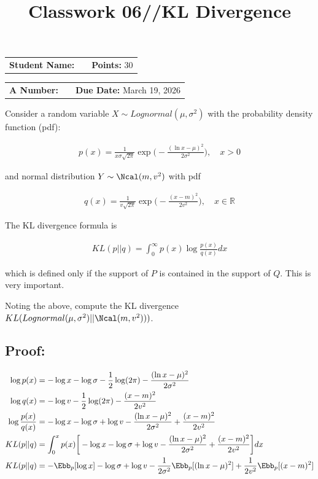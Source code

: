 \documentclass[12pt, xcolor=dvipsnames,svgnames,x11names]{article}
\makeatletter
\newcommand{\hw}{Classwork 06//KL Divergence}
\newcommand{\duedate}{March 19, 2026}
\renewcommand{\maketitle}{%
    \vspace*{0.2cm}
    \begin{center}
        \begin{tcolorbox}[
            enhanced,
            colback=white,
            colframe=headerRed,
            arc=0mm,
            title={\textcolor{white}{\bfseries \@title}},
            coltitle=white,
            fonttitle=\bfseries\large,
            attach boxed title to top left={xshift=10pt, yshift=-\tcboxedtitleheight/2},
            boxed title style={sharp corners, colback=headerRed, frame hidden}
        ]
        \large
        \vspace{10pt}
\noindent
\begin{tabular}{@{}p{3.5cm}p{6cm}r@{}}
\textbf{Student Name:} & \underline{\hspace{6cm}} & \textbf{Points:} 30 \\
\end{tabular}

\vspace{10pt}

\noindent
\begin{tabular}{@{}p{3.5cm}p{6cm}r@{}}
\textbf{A Number:} & \underline{\hspace{6cm}} & \textbf{Due Date:} \duedate \\
\end{tabular}
        \end{tcolorbox}
    \end{center}
    \vspace{10pt}
}
\makeatother
\begin{document}
\title{\hw}
\maketitle


Consider a random variable $X \sim Lognormal(\mu, \sigma^2)$ with the probability density function (pdf):

\begin{align*}
p(x) = \frac{1}{x\sigma \sqrt{2\pi}} \exp \bigg( - \frac{(\ln x - \mu)^2}{2\sigma^2} \bigg), \quad x > 0
\end{align*}

and normal distribution $Y\sim \Ncal (m, v^2)$ with pdf

\begin{align*}
q(x) = \frac{1}{v\sqrt{2\pi}} \exp \bigg( -\frac{(x-m)^2}{2v^2}  \bigg), \quad x\in \mathbb{R}
\end{align*}

The KL divergence formula is 

\begin{align*}
KL(p || q) = \int_0^\infty p(x) \log \frac{p(x)}{q(x)}dx
\end{align*}

which is defined only if the support of $P$ is contained in the support of $Q$. This is very important.

Noting the above, compute the KL divergence $KL(Lognormal(\mu, \sigma^2) ||  \Ncal (m, v^2)))$.


\subsection*{Proof:}

\begin{align*}
\log p(x) & = -\log x - \log \sigma - \frac{1}{2} \log (2\pi) - \frac{(\ln x - \mu)^2}{2\sigma^2}\\
\log q(x) & = -\log v - \frac{1}{2} \log (2 \pi) - \frac{(x - m)^2}{2 v^2}\\
\log \frac{p(x)}{q(x)} & = -\log x - \log \sigma + \log v -  \frac{(\ln x - \mu)^2}{2\sigma^2} + \frac{(x - m)^2}{2 v^2}\\
KL(p||q) & = \int_0^x p(x) \bigg [  -\log x - \log \sigma + \log v -  \frac{(\ln x - \mu)^2}{2\sigma^2} + \frac{(x - m)^2}{2 v^2} \bigg] dx\\
KL(p||q) & = - \Ebb_p[\log x] -\log \sigma  + \log v -\frac{1}{2\sigma^2}\Ebb_p[ (\ln x - \mu)^2] + \frac{1}{2v^2}\Ebb_p[(x-m)^2]
\end{align*}
\end{document}
